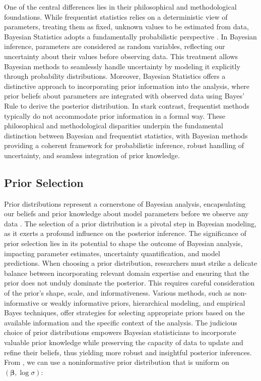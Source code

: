 One of the central differences lies in their philosophical and methodological foundations. While frequentist statistics relies on a deterministic view of parameters, treating them as fixed, unknown values to be estimated from data, Bayesian Statistics adopts a fundamentally probabilistic perspective \cite{fornacon2022understanding}. In Bayesian inference, parameters are considered as random variables, reflecting our uncertainty about their values before observing data. This treatment allows Bayesian methods to seamlessly handle uncertainty by modeling it explicitly through probability distributions. Moreover, Bayesian Statistics offers a distinctive approach to incorporating prior information into the analysis, where prior beliefs about parameters are integrated with observed data using Bayes' Rule to derive the posterior distribution. In stark contrast, frequentist methods typically do not accommodate prior information in a formal way. These philosophical and methodological disparities underpin the fundamental distinction between Bayesian and frequentist statistics, with Bayesian methods providing a coherent framework for probabilistic inference, robust handling of uncertainty, and seamless integration of prior knowledge.

\subsection{Prior Selection}

Prior distributions represent a cornerstone of Bayesian analysis, encapsulating our beliefs and prior knowledge about model parameters before we observe any data \cite{gelman2002prior}. The selection of a prior distribution is a pivotal step in Bayesian modeling, as it exerts a profound influence on the posterior inference. The significance of prior selection lies in its potential to shape the outcome of Bayesian analysis, impacting parameter estimates, uncertainty quantification, and model predictions. When choosing a prior distribution, researchers must strike a delicate balance between incorporating relevant domain expertise and ensuring that the prior does not unduly dominate the posterior. This requires careful consideration of the prior's shape, scale, and informativeness. Various methods, such as non-informative or weakly informative priors, hierarchical modeling, and empirical Bayes techniques, offer strategies for selecting appropriate priors based on the available information and the specific context of the analysis. The judicious choice of prior distributions empowers Bayesian statisticians to incorporate valuable prior knowledge while preserving the capacity of data to update and refine their beliefs, thus yielding more robust and insightful posterior inferences. From \cite{gelman2013bayesian}, we can use a noninformative prior distribution that is uniform on $\left( \bm{\beta}, \log \sigma \right)$:


